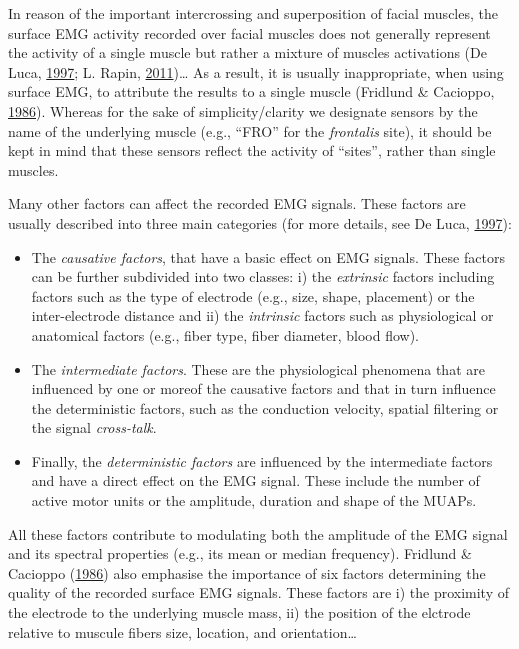 \documentclass[a4paper,12pt,twoside,openright,oldfontcommands]{memoir}
\begin{document}
In reason of the important intercrossing and superposition of facial
muscles, the surface EMG activity recorded over facial muscles does not
generally represent the activity of a single muscle but rather a mixture
of muscles activations (De Luca,
\protect\hyperlink{ref-de_luca_use_1997}{1997}; L. Rapin,
\protect\hyperlink{ref-Rapin2011}{2011})\ldots{} As a result, it is
usually inappropriate, when using surface EMG, to attribute the results
to a single muscle (Fridlund \& Cacioppo,
\protect\hyperlink{ref-fridlund_guidelines_1986}{1986}). Whereas for the
sake of simplicity/clarity we designate sensors by the name of the
underlying muscle (e.g., ``FRO'' for the \emph{frontalis} site), it
should be kept in mind that these sensors reflect the activity of
``sites'', rather than single muscles.

Many other factors can affect the recorded EMG signals. These factors
are usually described into three main categories (for more details, see
De Luca, \protect\hyperlink{ref-de_luca_use_1997}{1997}):

\begin{itemize}
\item
  The \emph{causative factors}, that have a basic effect on EMG signals.
  These factors can be further subdivided into two classes: i) the
  \emph{extrinsic} factors including factors such as the type of
  electrode (e.g., size, shape, placement) or the inter-electrode
  distance and ii) the \emph{intrinsic} factors such as physiological or
  anatomical factors (e.g., fiber type, fiber diameter, blood flow).
\item
  The \emph{intermediate factors}. These are the physiological phenomena
  that are influenced by one or moreof the causative factors and that in
  turn influence the deterministic factors, such as the conduction
  velocity, spatial filtering or the signal \emph{cross-talk}.
\item
  Finally, the \emph{deterministic factors} are influenced by the
  intermediate factors and have a direct effect on the EMG signal. These
  include the number of active motor units or the amplitude, duration
  and shape of the MUAPs.
\end{itemize}

All these factors contribute to modulating both the amplitude of the EMG
signal and its spectral properties (e.g., its mean or median frequency).
Fridlund \& Cacioppo
(\protect\hyperlink{ref-fridlund_guidelines_1986}{1986}) also emphasise
the importance of six factors determining the quality of the recorded
surface EMG signals. These factors are i) the proximity of the electrode
to the underlying muscle mass, ii) the position of the elctrode relative
to muscule fibers size, location, and orientation\ldots{}
\end{document}
